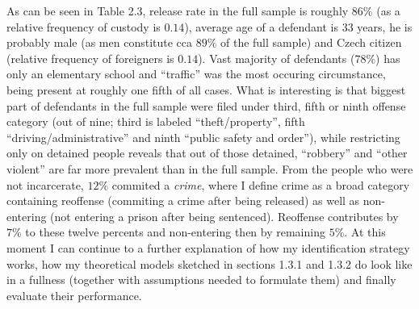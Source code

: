 \documentclass[12pt, twoside,openany]{book} %
\begin{document}
As can be seen in Table 2.3, release rate in the full sample is roughly $86\%$ (as a relative frequency of custody is $0.14$), average age of a defendant is $33$ years, he is probably male (as men constitute cca $89$\% of the full sample) and Czech citizen (relative frequency of foreigners is $0.14$). Vast majority of defendants ($78\%$) has only an elementary school and “traffic” was the most occuring circumstance, being present at roughly one fifth of all cases. What is interesting is that biggest part of defendants in the full sample were filed under third, fifth or ninth offense category (out of nine; third is labeled “theft/property”, fifth “driving/administrative” and ninth “public safety and order”), while restricting only on detained people reveals that out of those detained, “robbery” and “other violent” are far more prevalent than in the full sample.\newline
From the people who were not incarcerate, $12\%$ commited a \textit{crime}, where I define crime as a broad category containing reoffense (commiting a crime after being released) as well as non-entering (not entering a prison after being sentenced). Reoffense contributes by $7\%$ to these twelve percents and non-entering then by remaining $5\%$. \newline
At this moment I can continue to a further explanation of how my identification strategy works, how my theoretical models sketched in sections 1.3.1 and 1.3.2 do look like in a fullness (together with assumptions needed to formulate them) and finally evaluate their performance.
\end{document}
